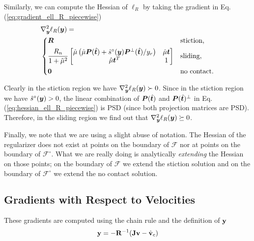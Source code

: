 Similarly, we can compute the Hessian of $\ell_R$ by taking the gradient in Eq.
(\ref{eq:gradient_ell_R_piecewise})
\begin{align}
	&\nabla_\vf{y}^2\ell_R(\vf{y}) = 
	\label{eq:hessian_ell_R_piecewise}\\
&\begin{dcases}
	\vf{R} & 
	\text{stiction,}\\
	\frac{R_n}{1+\tilde\mu^2}
	\begin{bmatrix}
		\hat{\mu}\left(\hat{\mu}\vf{P}(\hat{\vf{t}})+\hat{s}^\circ(\vf{y})\vf{P}^\perp(\hat{\vf{t}})/y_r\right) & 
		\hat{\mu}\vf{t}\\
		\hat{\mu}\vf{t}^T & 
		1\\
	\end{bmatrix} &
	\text{sliding,}\\
    \vf{0} & \text{no contact.}
\end{dcases}\nonumber
\end{align}

Clearly in the stiction region we have $\nabla_{\bm{y}}^2\ell_R({\bm{y}})\succ 0$.
Since in the stiction region we have $\hat{s}^\circ({\bm{y}})>0$, the linear
combination of ${\bm{P}}(\hat{{\bm{t}}})$ and ${\bm{P}}(\hat{{\bm{t}}})^\perp$ in Eq.
(\ref{eq:hessian_ell_R_piecewise}) is PSD (since both projection matrices are
PSD). Therefore, in the sliding region we find out that
$\nabla_{\bm{y}}^2\ell_R({\bm{y}})\succeq 0$.

Finally, we note that we are using a slight abuse of notation. The Hessian of
the regularizer does not exist at points on the boundary of $\mathcal{F}$ nor at
points on the boundary of $\mathcal{F}^\circ$. What we are really doing is
analytically \emph{extending} the Hessian on those points; on the boundary of
$\mathcal{F}$ we extend the stiction solution and on the boundary of
$\mathcal{F}^\circ$ we extend the no contact solution.

\subsection{Gradients with Respect to Velocities}
These gradients are computed using the chain rule and the definition of ${\mathbf{y}}$
\begin{equation*}
	{\mathbf{y}}=-{\mathbf{R}}^{-1}({\mathbf{J}}{\mathbf{v}} - \hat{{\mathbf{v}}}_c)
\end{equation*}

